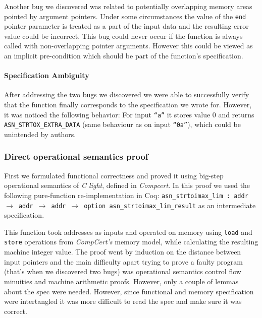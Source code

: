 \documentclass[acmsmall,nonacm]{acmart}
\begin{document}
Another bug we discovered was related to potentially overlapping
memory areas pointed by argument pointers. Under some circumstances
the value of the \texttt{end} pointer parameter is treated as a part
of the input data and the resulting error value could be
incorrect. This bug could never occur if the function is always called
with non-overlapping pointer arguments. However this could be viewed
as an implicit pre-condition which should be part of the function's
specification.

\paragraph{Specification Ambiguity}

After addressing the two bugs we discovered we were able to
successfully verify that the function finally corresponds to the
specification we wrote for. However, it was noticed the following
behavior: For input \texttt{``a''} it stores value 0 and returns {\color{green}\texttt{ASN\_STRTOX\_EXTRA\_DATA}} (same behaviour as on input \texttt{``0a''}), which could be unintended by authors. \\

  
\subsubsection{Direct operational semantics proof}

First we formulated functional correctness and proved it using
big-step operational semantics of \textit{C light}, defined in
\textit{Compcert}. In this proof we used the following pure-function
re-implementation in Coq: \texttt{asn\_strtoimax\_lim : addr $\rightarrow$
  addr $\rightarrow$ addr $\rightarrow$ option
  asn\_strtoimax\_lim\_result} as an intermediate specification.

This function took addresses as inputs and operated on memory using
\texttt{load} and \texttt{store} operations from \textit{CompCert's}
memory model, while calculating the resulting machine integer
value. The proof went by induction on the distance between input
pointers and the main difficulty apart trying to prove a faulty
program (that's when we discovered two bugs) was operational semantics
control flow minuities and machine arithmetic proofs. However, only a
couple of lemmas about the spec were needed. However, since functional
and memory specification were intertangled it was more difficult to
read the spec and make sure it was correct.
\end{document}
